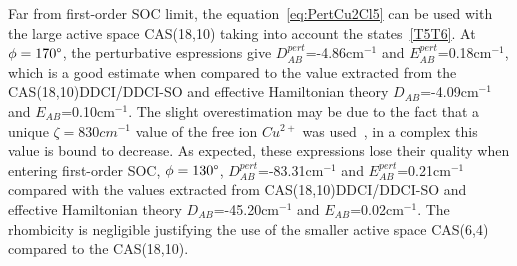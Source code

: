 \documentclass[12pt]{report}
\numberwithin{equation}{section}
\begin{document}
Far from first-order SOC limit, the equation~\ref{eq:PertCu2Cl5} can be used with the large active space CAS(18,10) taking into account the states~\ref{T5T6}.
At $\phi=170\degree$, the perturbative espressions give $D_{AB}^{pert}$=-4.86cm$^{-1}$ and $E_{AB}^{pert}$=0.18cm$^{-1}$, which is a good estimate when compared to the value extracted from the CAS(18,10)DDCI/DDCI-SO and effective Hamiltonian theory $D_{AB}$=-4.09cm$^{-1}$ and $E_{AB}$=0.10cm$^{-1}$.
The slight overestimation may be due to the fact that a unique $\zeta=830cm^{-1}$ value of the free ion $Cu^{2+}$ was used~\cite{dunn_spin-orbit_1961}, in a complex this value is bound to decrease.
As expected, these expressions lose their quality when entering first-order SOC, $\phi=130\degree$, $D_{AB}^{pert}$=-83.31cm$^{-1}$ and $E_{AB}^{pert}$=0.21cm$^{-1}$ compared with the values extracted from CAS(18,10)DDCI/DDCI-SO and effective Hamiltonian theory $D_{AB}$=-45.20cm$^{-1}$ and $E_{AB}$=0.02cm$^{-1}$.
The rhombicity is negligible justifying the use of the smaller active space CAS(6,4) compared to the CAS(18,10).
\end{document}
